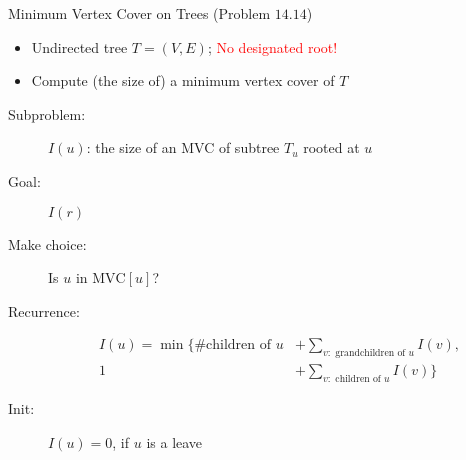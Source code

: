 
\begin{frame}{}
  \centerline{}
\end{frame}

\begin{frame}{}
  \begin{exampleblock}{Minimum Vertex Cover on Trees (Problem $14.14$)}
    \begin{itemize}
      \item Undirected tree $T = (V, E)$; \textcolor{red}{No designated root!}
      \item Compute (the size of) a minimum vertex cover of $T$
    \end{itemize}
  \end{exampleblock}

\end{frame}
\begin{frame}{}
  \centerline{}
  \pause
  \vspace{0.30cm}

  \begin{description}
	\item[Subproblem:] $I(u)$: the size of an MVC of subtree $T_{u}$ rooted at $u$
	\item[Goal:] $I(r)$
	  \pause
	\item[Make choice:] Is $u$ in $\text{MVC}[u]$?
	\item[Recurrence:] 
	  \begin{align*}
		I(u) = \min \{\text{\# children of } u &+ \sum_{v: \text{ grandchildren of } u} I(v), \\
			1 &+ \sum_{v: \text{ children of } u} I(v)\}
	  \end{align*}
	  \pause
	\item[Init:] $I(u) = 0$, if $u$ is a leave
  \end{description}

  \pause
  \vspace{0.30cm}
  \centerline{}
\end{frame}
